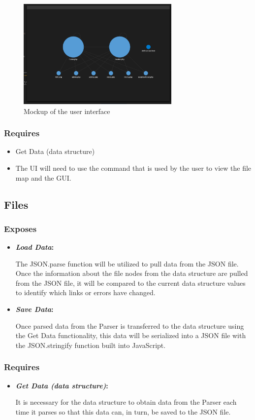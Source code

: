 \documentclass[letterpaper,10pt,titlepage,draftclsnofoot,onecolumn,onesided] {IEEEtran}
\newcommand{\boldit}[2]{
	\textbf{\textit{#1}#2}
}
\begin{document}
\begin{figure}
	\includegraphics[width=300px]{UIMockupEPS.eps}
	\caption{Mockup of the user interface}
\end{figure}
		
\subsubsection{Requires}
\begin{itemize}
	\item Get Data (data structure)
	\item The UI will need to use the command that is used by the user to view the file map and the GUI.
\end{itemize}
		
\subsection{Files}

\subsubsection{Exposes}
\begin{itemize}
	\item \boldit{Load Data}{:}
The JSON.parse function will be utilized to pull data from the JSON file. 
Once the information about the file nodes from the data structure are pulled from the JSON file, it will be compared to the current data structure values to identify which links or errors have changed. \cite{stringify}
	\item \boldit{Save Data}{:}
Once parsed data from the Parser is transferred to the data structure using the Get Data functionality, this data will be serialized into a JSON file with the JSON.stringify function built into JavaScript.
\end{itemize}
		
\subsubsection{Requires}
\begin{itemize}
	\item \boldit{Get Data (data structure)}{:}
It is necessary for the data structure to obtain data from the Parser each time it parses so that this data can, in turn, be saved to the JSON file.
\end{itemize}
\end{document}
